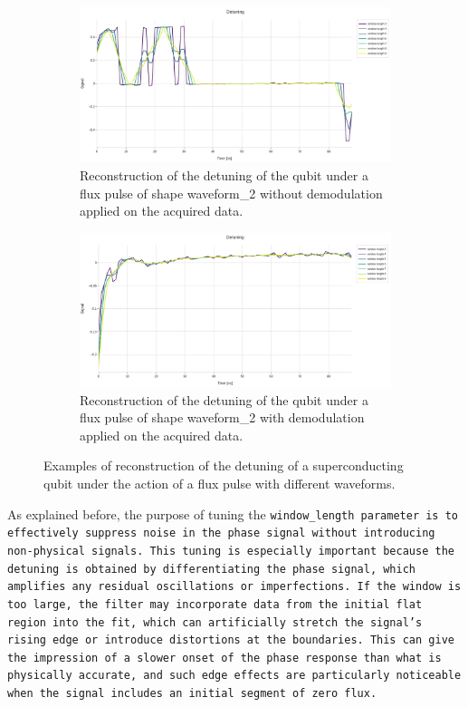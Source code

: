 \begin{figure}[h!]
    \begin{subfigure}[t]{0.45\textwidth}
        \includegraphics[width=\textwidth]{figures/png/Cryoscope/no_demod/long/detuning_windows.png}
        \caption{Reconstruction of the detuning of the qubit under a flux pulse of shape waveform\_2 without demodulation applied on the acquired data.}
        \label{fig:detuning:long_no_dem}
    \end{subfigure}
    \hfill
    \begin{subfigure}[t]{0.45\textwidth}
        \includegraphics[width=\textwidth]{figures/png/Cryoscope/demodulation/long/detuning_windows.png}
        \caption{Reconstruction of the detuning of the qubit under a flux pulse of shape waveform\_2 with demodulation applied on the acquired data.}
        \label{fig:detuning:long_dem}
    \end{subfigure}

    \caption{Examples of reconstruction of the detuning of a superconducting qubit under the action of a flux pulse with different waveforms.}
    \label{fig:detuning}
\end{figure}

As explained before, the purpose of tuning the \tt{window\_length} parameter is to effectively suppress noise in the phase signal without introducing non-physical signals. 
This tuning is especially important because the detuning is obtained by differentiating the phase signal, which amplifies any residual oscillations or imperfections. 
If the window is too large, the filter may incorporate data from the initial flat region into the fit, which can artificially stretch the signal's rising edge or introduce distortions at the boundaries. 
This can give the impression of a slower onset of the phase response than what is physically accurate, and such edge effects are particularly noticeable when the signal includes an initial segment of zero flux.


